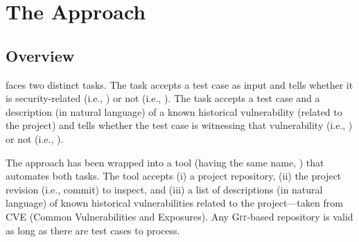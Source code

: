 \section{The \vuteco Approach}
\label{sec:vuteco}

\subsection{Overview}
\label{subsec:vuteco_overview}

\vuteco faces two distinct tasks.
The \finding task accepts a \JUnit test case as input and tells whether it is security-related (i.e., \finderPosClass) or not (i.e., \finderNegClass).
The \matching task accepts a \JUnit test case and a description (in natural language) of a known historical vulnerability (related to the project) and tells whether the test case is witnessing that vulnerability (i.e., \globalPosClass) or not (i.e., \globalNegClass).

The \vuteco approach has been wrapped into a tool (having the same name, \vuteco) that automates both tasks.
The tool accepts (i) a \Java project repository, (ii) the project revision (i.e., commit) to inspect, and (iii) a list of descriptions (in natural language) of known historical vulnerabilities related to the project---taken from CVE (Common Vulnerabilities and Exposures).
Any \textsc{Git}-based repository is valid as long as there are \JUnit test cases to process.

